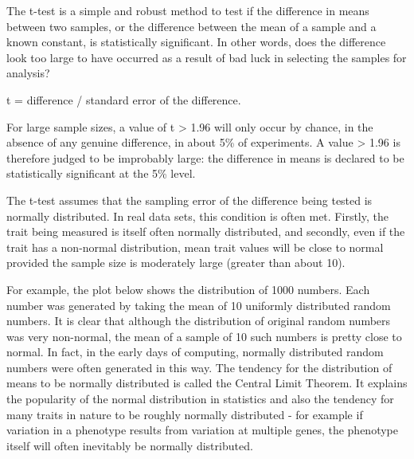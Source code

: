 \documentclass[
]{book}
\begin{document}
The t-test is a simple and robust method to test if the difference in means between two samples, or the difference between the mean of a sample and a known constant, is statistically significant. In other words, does the difference look too large to have occurred as a result of bad luck in selecting the samples for analysis?

t = difference / standard error of the difference.

For large sample sizes, a value of t \textgreater{} 1.96 will only occur by chance, in the absence of any genuine difference, in about 5\% of experiments. A value \textgreater{} 1.96 is therefore judged to be improbably large: the difference in means is declared to be statistically significant at the 5\% level.

The t-test assumes that the sampling error of the difference being tested is normally distributed. In real data sets, this condition is often met. Firstly, the trait being measured is itself often normally distributed, and secondly, even if the trait has a non-normal distribution, mean trait values will be close to normal provided the sample size is moderately large (greater than about 10).

For example, the plot below shows the distribution of 1000 numbers. Each number was generated by taking the mean of 10 uniformly distributed random numbers. It is clear that although the distribution of original random numbers was very non-normal, the mean of a sample of 10 such numbers is pretty close to normal. In fact, in the early days of computing, normally distributed random numbers were often generated in this way. The tendency for the distribution of means to be normally distributed is called the Central Limit Theorem. It explains the popularity of the normal distribution in statistics and also the tendency for many traits in nature to be roughly normally distributed - for example if variation in a phenotype results from variation at multiple genes, the phenotype itself will often inevitably be normally distributed.
\end{document}
